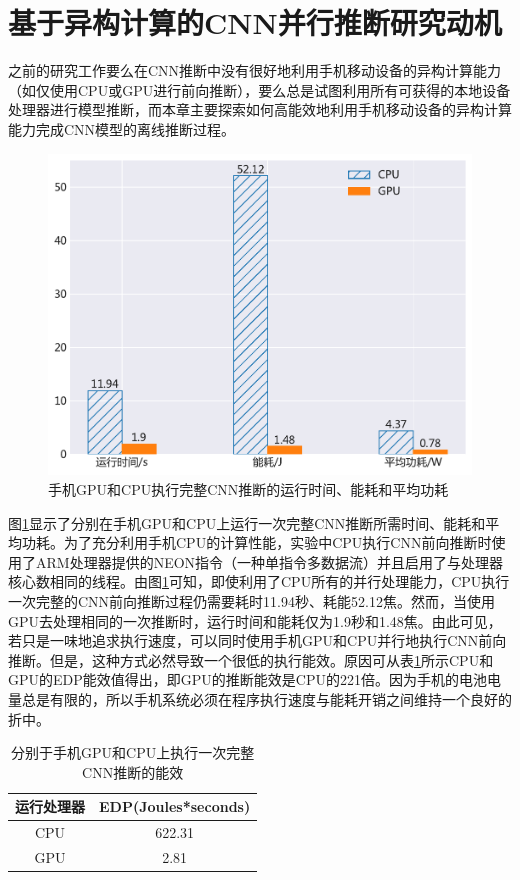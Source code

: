 \section{基于异构计算的CNN并行推断研究动机}
\label{chapter:chapter4-2}
之前的研究工作要么在CNN推断中没有很好地利用手机移动设备的异构计算能力（如仅使用CPU或GPU进行前向推断），要么总是试图利用所有可获得的本地设备处理器进行模型推断，而本章主要探索如何高能效地利用手机移动设备的异构计算能力完成CNN模型的离线推断过程。

\begin{figure}[htbp]
    \centering
    \includegraphics[height=0.4\textwidth]{figures/yolo_energy.pdf}
    \caption{手机GPU和CPU执行完整CNN推断的运行时间、能耗和平均功耗}\label{figure:figure28}
\end{figure}

图\ref{figure:figure28}显示了分别在手机GPU和CPU上运行一次完整CNN推断所需时间、能耗和平均功耗。为了充分利用手机CPU的计算性能，实验中CPU执行CNN前向推断时使用了ARM处理器提供的NEON指令（一种单指令多数据流）并且启用了与处理器核心数相同的线程。由图\ref{figure:figure28}可知，即使利用了CPU所有的并行处理能力，CPU执行一次完整的CNN前向推断过程仍需要耗时11.94秒、耗能52.12焦。然而，当使用GPU去处理相同的一次推断时，运行时间和能耗仅为1.9秒和1.48焦。由此可见，若只是一味地追求执行速度，可以同时使用手机GPU和CPU并行地执行CNN前向推断。但是，这种方式必然导致一个很低的执行能效。原因可从表\ref{table:table9}所示CPU和GPU的EDP能效值得出，即GPU的推断能效是CPU的221倍。因为手机的电池电量总是有限的，所以手机系统必须在程序执行速度与能耗开销之间维持一个良好的折中。

\begin{table}[htbp]
  \centering
  \caption{分别于手机GPU和CPU上执行一次完整CNN推断的能效}
  \label{table:table9}
  \begin{tabular}{cc}
    \toprule
      运行处理器 & EDP(Joules*seconds) \\
    \midrule
      CPU & 622.31 \\
      GPU & 2.81 \\
    \bottomrule
  \end{tabular}
\end{table}

